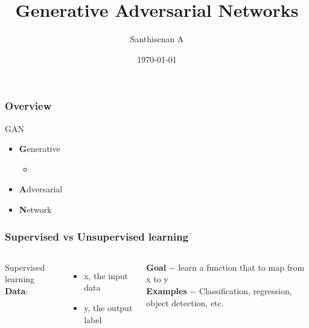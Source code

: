 \documentclass{beamer}
\title{Generative Adversarial Networks}
\author{Santhisenan A}
\institute{Department of Computer Science \& Engineering
\\ College of Engineering Trivandrum}
\date{\today}
\begin{document}
\frame{\titlepage}

\begin{frame}
\frametitle{Overview}
\tableofcontents
\end{frame}

\begin{frame}{GAN}
    \begin{itemize}
        \item{\textbf{G}enerative}
            \begin{itemize}
                \item {}
            \end{itemize}
        \item{\textbf{A}dversarial}
        \item{\textbf{N}etwork}
    \end{itemize}
\end{frame}  

\begin{frame}
    \frametitle{Supervised vs Unsupervised learning}
    \begin{columns}
            {\Large Supervised learning} \\
            \textbf{Data}:
            \begin{itemize}
                \item{x, the input data}
                \item{y, the output label}
            \end{itemize}
            \textbf{Goal} $-$ learn a function that to map from x to y \\
            \textbf{Examples} $-$ Classification, regression, object detection, etc.
            

    \end{columns}

\end{frame}
\end{document}
